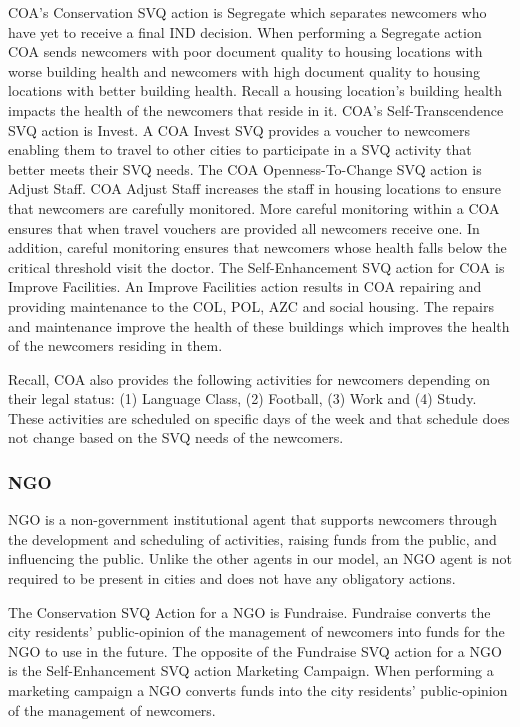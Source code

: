 \documentclass{scspaperproc}
\theoremstyle{scsthe}
\begin{document}
COA's Conservation SVQ action is Segregate which separates newcomers who have yet to receive a final IND decision. When performing a Segregate action COA sends newcomers with poor document quality to housing locations with worse building health and newcomers with high document quality to housing locations with better building health. Recall a housing location's building health impacts the health of the newcomers that reside in it. COA's Self-Transcendence SVQ action is Invest. A COA Invest SVQ provides a voucher to newcomers enabling them to travel to other cities to participate in a SVQ activity that better meets their SVQ needs. The COA Openness-To-Change SVQ action is Adjust Staff. COA Adjust Staff increases the staff in housing locations to ensure that newcomers are carefully monitored. More careful monitoring within a COA ensures that when travel vouchers are provided all newcomers receive one. In addition, careful monitoring ensures that newcomers whose health falls below the critical threshold visit the doctor. The Self-Enhancement SVQ action for COA is Improve Facilities.  An Improve Facilities action results in COA repairing and providing maintenance to the COL, POL, AZC and social housing. The repairs and maintenance improve the health of these buildings which improves the health of the newcomers residing in them.

Recall, COA also provides the following activities for newcomers depending on their legal status: (1) Language Class, (2) Football, (3) Work and (4) Study. These activities are scheduled on specific days of the week and that schedule does not change based on the SVQ needs of the newcomers.

\subsubsection{NGO}
NGO is a non-government institutional agent that supports newcomers through the development and scheduling of activities, raising funds from the public, and influencing the public. Unlike the other agents in our model, an NGO agent is not required to be present in cities and does not have any obligatory actions. 

The Conservation SVQ Action for a NGO is Fundraise. Fundraise converts the city residents' public-opinion of the management of newcomers into funds for the NGO to use in the future. The opposite of the Fundraise SVQ action for a NGO is the Self-Enhancement SVQ action Marketing Campaign. When performing a marketing campaign a NGO converts funds into the city residents' public-opinion of the management of newcomers. 
\end{document}
